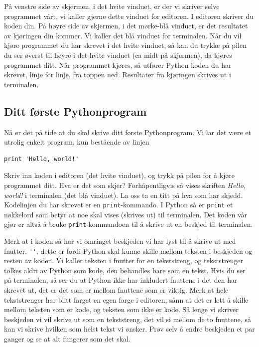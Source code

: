 \documentclass[a4paper, 11pt, notitlepage]{article}
\begin{document}
På venstre side av skjermen, i det hvite vinduet, er der vi skriver selve programmet vårt, vi kaller gjerne dette vinduet for editoren. I editoren skriver du koden din. På høyre side av skjermen, i det mørke-blå vinduet, er det resultatet av kjøringen din kommer. Vi kaller det blå vinduet for terminalen. Når du vil kjøre programmet du har skrevet i det hvite vinduet, så kan du trykke på pilen du ser øverst til høyre i det hvite vinduet (ca midt på skjermen), da kjøres programmet ditt. Når programmet kjøres, så utfører Python koden du har skrevet, linje for linje, fra toppen ned. Resultater fra kjøringen skrives ut i terminalen.

\subsection*{Ditt første Pythonprogram}

Nå er det på tide at du skal skrive ditt første Pythonprogram. Vi lar det være et utrolig enkelt program, kun bestående av linjen 
\begin{lstlisting}
print 'Hello, world!'
\end{lstlisting}
Skriv inn koden i editoren (det hvite vinduet), og trykk på pilen for å kjøre programmet ditt. Hva er det som skjer? Forhåpentligvis så vises skriften \emph{Hello, world!} i terminalen (det blå vinduet). La oss ta en titt på hva som har skjedd. Kodelinjen du har skrevet er en \verb+print+-kommando. I Python så er \verb+print+ et nøkkelord som betyr at noe skal vises (skrives ut) til terminalen. Det koden vår gjør er altså å bruke \verb+print+-kommandoen til å skrive ut en beskjed til terminalen.

Merk at i koden så har vi omringet beskjeden vi har lyst til å skrive ut med fnutter, \verb+''+, dette er fordi Python skal kunne skille mellom teksten i beskjeden og resten av koden. Vi kaller teksten i fnutter for en tekststreng, og tekststrenger tolkes aldri av Python som kode, den behandles bare som en tekst. Hvis du ser på terminalen, så ser du at Python ikke har inkludert fnuttene i det den har skrevet ut, det er det som er mellom fnuttene som er viktig. Merk at hele tekststrenger har blitt farget en egen farge i editoren, sånn at det er lett å skille mellom teksten som er kode, og teksten som ikke er kode. Så lenge vi skriver beskjeden vi vil skrive ut som en tekststreng, det vil si mellom de to fnuttene, så kan vi skrive hvilken som helst tekst vi ønsker. Prøv selv å endre beskjeden et par ganger og se at alt fungerer som det skal.
\end{document}

